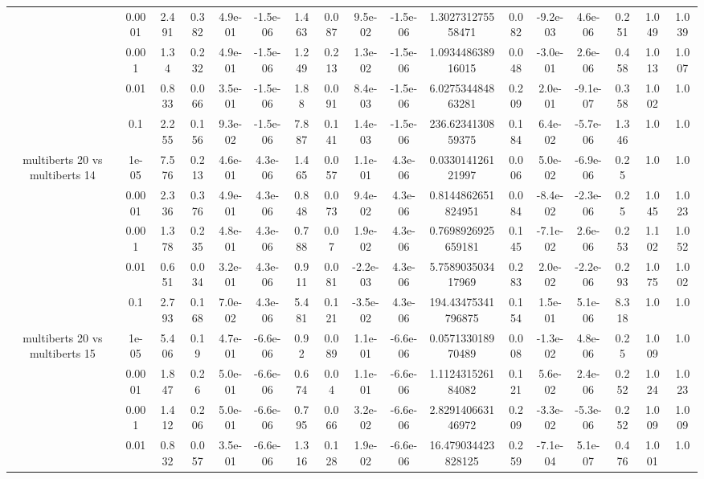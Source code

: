 \begin{tabular}{|c|c|c|c|c|c|c|c|c|c|c|c|c|c|c|c|c|}
 & 0.0001 & 2.491 & 0.382 & 4.9e-01 & -1.5e-06 & 1.463 & 0.087 & 9.5e-02 & -1.5e-06 & 1.302731275558471 & 0.082 & -9.2e-03 & 4.6e-06 & 0.251 & 1.049 & 1.039 \\
 & 0.001 & 1.34 & 0.232 & 4.9e-01 & -1.5e-06 & 1.249 & 0.213 & 1.3e-02 & -1.5e-06 & 1.093448638916015 & 0.048 & -3.0e-01 & 2.6e-06 & 0.458 & 1.013 & 1.007 \\
 & 0.01 & 0.833 & 0.066 & 3.5e-01 & -1.5e-06 & 1.88 & 0.091 & 8.4e-03 & -1.5e-06 & 6.027534484863281 & 0.209 & 2.0e-01 & -9.1e-07 & 0.358 & 1.002 & 1.0 \\
 & 0.1 & 2.255 & 0.156 & 9.3e-02 & -1.5e-06 & 7.887 & 0.141 & 1.4e-03 & -1.5e-06 & 236.6234130859375 & 0.184 & 6.4e-02 & -5.7e-06 & 1.346 & 1.0 & 1.0 \\
\hline
\multirow{5}{*}{multiberts 20 vs multiberts 14} & 1e-05 & 7.576 & 0.213 & 4.6e-01 & 4.3e-06 & 1.465 & 0.057 & 1.1e-01 & 4.3e-06 & 0.033014126121997 & 0.006 & 5.0e-02 & -6.9e-06 & 0.25 & 1.0 & 1.0 \\
 & 0.0001 & 2.336 & 0.376 & 4.9e-01 & 4.3e-06 & 0.848 & 0.073 & 9.4e-02 & 4.3e-06 & 0.8144862651824951 & 0.084 & -8.4e-02 & -2.3e-06 & 0.25 & 1.045 & 1.023 \\
 & 0.001 & 1.378 & 0.235 & 4.8e-01 & 4.3e-06 & 0.788 & 0.07 & 1.9e-02 & 4.3e-06 & 0.7698926925659181 & 0.145 & -7.1e-02 & 2.6e-06 & 0.253 & 1.102 & 1.052 \\
 & 0.01 & 0.651 & 0.034 & 3.2e-01 & 4.3e-06 & 0.911 & 0.081 & -2.2e-03 & 4.3e-06 & 5.758903503417969 & 0.283 & 2.0e-02 & -2.2e-06 & 0.293 & 1.075 & 1.002 \\
 & 0.1 & 2.793 & 0.168 & 7.0e-02 & 4.3e-06 & 5.481 & 0.121 & -3.5e-02 & 4.3e-06 & 194.43475341796875 & 0.154 & 1.5e-01 & 5.1e-06 & 8.318 & 1.0 & 1.0 \\
\hline
\multirow{5}{*}{multiberts 20 vs multiberts 15} & 1e-05 & 5.406 & 0.19 & 4.7e-01 & -6.6e-06 & 0.92 & 0.089 & 1.1e-01 & -6.6e-06 & 0.057133018970489 & 0.008 & -1.3e-02 & 4.8e-06 & 0.25 & 1.009 & 1.0 \\
 & 0.0001 & 1.847 & 0.26 & 5.0e-01 & -6.6e-06 & 0.674 & 0.04 & 1.1e-01 & -6.6e-06 & 1.112431526184082 & 0.121 & 5.6e-02 & 2.4e-06 & 0.252 & 1.024 & 1.023 \\
 & 0.001 & 1.412 & 0.206 & 5.0e-01 & -6.6e-06 & 0.795 & 0.066 & 3.2e-02 & -6.6e-06 & 2.829140663146972 & 0.209 & -3.3e-02 & -5.3e-06 & 0.252 & 1.009 & 1.009 \\
 & 0.01 & 0.832 & 0.057 & 3.5e-01 & -6.6e-06 & 1.316 & 0.128 & 1.9e-02 & -6.6e-06 & 16.479034423828125 & 0.259 & -7.1e-04 & 5.1e-07 & 0.476 & 1.001 & 1.0 \\

\end{tabular}
